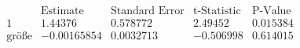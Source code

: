 \[\begin{array}{l|llll}
 \text{} & \text{Estimate} & \text{Standard Error} & \text{t-Statistic} & \text{P-Value} \\
\hline
 1 & 1.44376 & 0.578772 & 2.49452 & 0.015384 \\
 \text{gr{\" o}{\ss}e} & -0.00165854 & 0.0032713 & -0.506998 & 0.614015 \\
\end{array}\]

